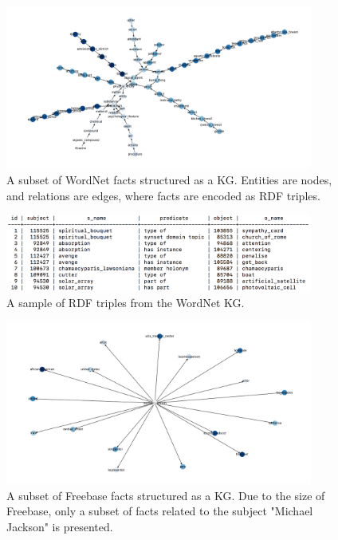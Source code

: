 \begin{figure}
   	\centering
    	\includegraphics[width=0.9\textwidth, height=0.5\textwidth]{Wordnet}
	\captionsetup{justification=centering}
	\caption{A subset of WordNet facts structured as a KG. Entities are nodes, and relations are edges, where facts are encoded as RDF triples.}
\end{figure}

\begin{figure}
   	\centering
    	\includegraphics[width=0.9\textwidth, height=0.2\textwidth]{wordnet_fact_sample}
	\captionsetup{justification=centering}
	\caption{A sample of RDF triples from the WordNet KG.}
\end{figure}

\begin{figure}
   	\centering
    	\includegraphics[width=0.9\textwidth, height=0.5\textwidth]{Freebase}
	\captionsetup{justification=centering}
	\caption{A subset of Freebase facts structured as a KG. Due to the size of Freebase, only a subset of facts related to the subject "Michael Jackson" is presented.}
\end{figure}

